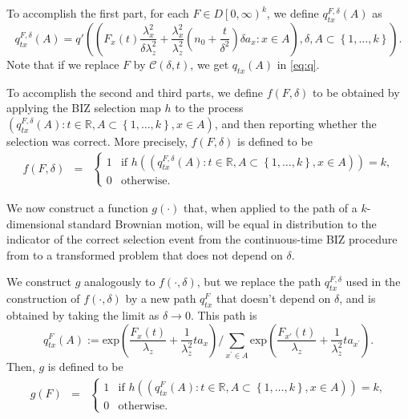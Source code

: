 \documentclass{wscpaperproc}
\theoremstyle{wsc}
\begin{document}
To accomplish the first part, for each $F\in D\left[0,\infty\right)^{k}$, 
we define $q_{tx}^{F,\delta}\left(A\right)$ as
\[
q_{tx}^{F,\delta}\left(A\right)=q'\left(\left(F_{x}\left(t\right)\frac{\lambda_{x}^{2}}{\delta\lambda_{z}^{2}}+\frac{\lambda_{x}^{2}}{\lambda_{z}^{2}}\left(n_{0}+\frac{t}{\delta^{2}}\right)\delta a_{x}:x\in A\right),\delta,A\subset\left\{ 1,\ldots,k\right\} \right).
\]
Note that if we replace $F$ by $\mathcal{C}\left(\delta,t\right)$,
we get $q_{tx}\left(A\right)$ in \eqref{eq:q}.   


To accomplish the second and third parts, we define
$f\left(F,\delta\right)$ to be obtained by applying the BIZ selection map $h$ to the process
$\left(q_{tx}^{F,\delta}\left(A\right):t\in\mathbb{R},A\subset\left\{ 1,\ldots,k\right\} ,x\in A\right)$, and then reporting whether the selection was correct.
More precisely, $f(F,\delta)$ is defined to be
\begin{eqnarray*}
f\left(F,\delta\right) & = & \begin{cases}
    1 & \text{if $h\left(\left(q_{tx}^{F,\delta}\left(A\right):t\in\mathbb{R},A\subset\left\{ 1,\ldots,k\right\} ,x\in A\right)\right) = k$,}\\
0 & \text{otherwise.}
\end{cases}
\end{eqnarray*}

We now construct a function $g(\cdot)$ that, when applied to the path of a $k$-dimensional standard Brownian motion, will be equal in distribution to the indicator of the correct selection event from the continuous-time BIZ procedure from \cite{Frazier:BIZ} 
to a transformed problem that does not depend on $\delta$.

We construct $g$ analogously to $f(\cdot,\delta)$, but we replace the path $q_{tx}^{F,\delta}$ used in the construction of $f(\cdot,\delta)$ by a new path $q_{tx}^{F}$ that doesn't depend on $\delta$, and is obtained by taking the limit as $\delta\to0$.  This path is
\[
q_{tx}^{F}\left(A\right):=\mbox{exp}\left(\frac{F_{x}\left(t\right)}{\lambda_{z}}+\frac{1}{\lambda_{z}^{2}}ta_{x}\right)/\sum_{x^{'}\in A}\mbox{exp}\left(\frac{F_{x'}\left(t\right)}{\lambda_{z}}+\frac{1}{\lambda_{z}^{2}}ta_{x^{'}}\right).
\]
Then, $g$ is defined to be
\begin{eqnarray*}
g\left(F\right) & = & \begin{cases}
    1 & \text{if $h\left(\left(q_{tx}^{F}\left(A\right):t\in\mathbb{R},A\subset\left\{ 1,\ldots,k\right\} ,x\in A\right)\right) = k$,}\\
0 & \text{otherwise.}
\end{cases}
\end{eqnarray*}
\end{document}
